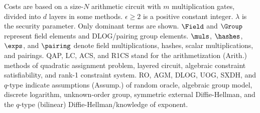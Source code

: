 \begin{table}[p]
{\begin{threeparttable}
\begin{tabular}
	\bottomrule
\end{tabular}
\begin{tablenotes}
	\item[Note]
	Costs are based on a size-$N$ arithmetic circuit with $m$ multiplication gates, divided into $d$ layers in some methods.
	$\epsilon \ge 2$ is a positive constant integer.
	$\lambda$ is the security parameter.
	Only dominant terms are shown.
	$\Field$ and $\Group$ represent 
	field elements and DLOG/pairing group elements.
	$\muls$, $\hashes$, $\exps$, and $\pairing$ denote field multiplications, hashes, scalar multiplications, and pairings.
	QAP, LC, ACS, and R1CS stand for the arithmetization (Arith.) methods of quadratic assignment problem, layered circuit, algebraic constraint satisfiability, and rank-1 constraint system.
	RO, AGM, DLOG, UOG, SXDH, and $q$-type indicate assumptions (Assump.) of random oracle, algebraic group model, discrete logarithm, unknown-order group, symmetric external Diffie-Hellman, and the $q$-type (bilinear) Diffie-Hellman/knowledge of exponent.
\end{tablenotes}
\end{threeparttable}
}
\end{table}
